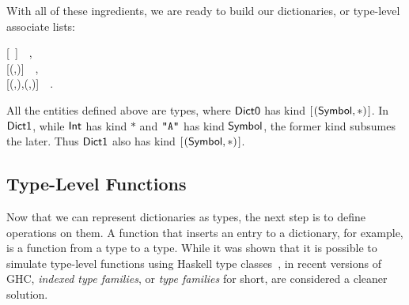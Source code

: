 With all of these ingredients, we are ready to build our dictionaries, or
type-level associate lists:
\begin{hscode}\SaveRestoreHook
{}%
%
\>[B]{}\;\mathrel{=}\mbox{\textquotesingle}[~]~~,{}\<[E]%
\\
\>[B]{}\;\mathrel{=}\mbox{\textquotesingle}[\mbox{\textquotesingle}(,)]~~,{}\<[E]%
\\
\>[B]{}\;\mathrel{=}\mbox{\textquotesingle}[\mbox{\textquotesingle}(,),\mbox{\textquotesingle}(,)]~~.{}\<[E]%
\ColumnHook
\end{hscode}\resethooks
All the entities defined above are types, where \ensuremath{\Conid{Dict0}} has kind \ensuremath{[\mskip1.5mu (\Conid{Symbol},\mathbin{*})\mskip1.5mu]}. In \ensuremath{\Conid{Dict1}}, while \ensuremath{\Conid{Int}} has kind \ensuremath{\mathbin{*}} and \ensuremath{\text{\tt \char34 A\char34}} has kind \ensuremath{\Conid{Symbol}}, the former kind subsumes the later. Thus \ensuremath{\Conid{Dict1}} also has kind \ensuremath{[\mskip1.5mu (\Conid{Symbol},\mathbin{*})\mskip1.5mu]}.

\subsection{Type-Level Functions}
\label{sec:type-fun}

Now that we can represent dictionaries as types, the next step is to define
operations on them. A function that inserts an entry to a dictionary, for
example, is a function from a type to a type. While it was shown that it is
possible to simulate type-level functions using Haskell type
classes~\cite{McBride:02:Faking}, in recent versions of GHC, {\em indexed type
families}, or \emph{type families} for short, are considered a cleaner solution.

